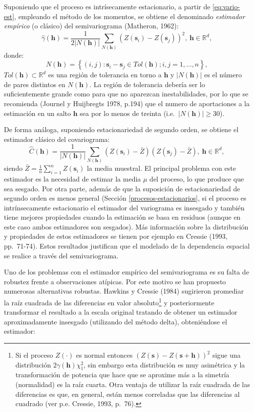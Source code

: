 \documentclass[
  spanish,
]{book}
\theoremstyle{break}
\begin{document}
Suponiendo que el proceso es intrísecamente estacionario, a partir de \eqref{eq:vario-est}, empleando el método de los momentos, se obtiene el denominado \emph{estimador empírico} (o clásico) del semivariograma (Matheron, 1962):
\[\hat{\gamma}(\mathbf{h}) = \dfrac{1}{2\left| N(\mathbf{h})\right| }
\sum\limits_{N(\mathbf{h})}\left( Z(\mathbf{s}_{i})-Z(\mathbf{s}_{j} )\right) ^2 ,\ \mathbf{h}\in \mathbb{R}^{d},\]
donde:
\[N(\mathbf{h}) = \left\{ (i,j):\mathbf{s}_{i} -\mathbf{s}_{j} \in Tol(\mathbf{h});i,j=1,\ldots,n\right\},\]
\(Tol(\mathbf{h})\subset \mathbb{R}^{d}\) es una región de tolerancia en torno a \(\mathbf{h}\) y \(\left| N(\mathbf{h})\right|\) es el número de pares distintos en \(N(\mathbf{h})\).
La región de tolerancia debería ser lo suficientemente grande como para que no aparezcan inestabilidades, por lo que se recomienda (Journel y Huijbregts 1978, p.194) que el numero de aportaciones a la estimación en un salto \(\mathbf{h}\) sea por lo menos de treinta (i.e.~\(\left| N(\mathbf{h})\right| \geq 30\)).

De forma análoga, suponiendo estacionariedad de segundo orden, se obtiene el estimador clásico del covariograma:
\[\hat{C} (\mathbf{h}) = \dfrac{1}{\left| N(\mathbf{h})\right| }
\sum\limits_{N(\mathbf{h})}\left( Z(\mathbf{s}_{i})-\bar{Z} \right)
\left( Z(\mathbf{s}_{j})-\bar{Z} \right),\ \mathbf{h}\in \mathbb{R}^{d},\]
siendo \(\bar{Z} =\frac{1}{n} \sum_{i=1}^{n}Z(\mathbf{s}_{i})\) la media muestral.
El principal problema con este estimador es la necesidad de estimar la media \(\mu\) del proceso, lo que produce que sea sesgado.
Por otra parte, además de que la suposición de estacionariedad de segundo orden es menos general (Sección \ref{procesos-estacionarios}, si el proceso es intrínsecamente estacionario el estimador del variograma es insesgado y también tiene mejores propiedades cuando la estimación se basa en residuos (aunque en este caso ambos estimadores son sesgados).
Más información sobre la distribución y propiedades de estos estimadores se tienen por ejemplo en Cressie (1993, pp.~71-74).
Estos resultados justifican que el modelado de la dependencia espacial se realice a través del semivariograma.

Uno de los problemas con el estimador empírico del semivariograma es su falta de robustez frente a observaciones atípicas.
Por este motivo se han propuesto numerosas alternativas robustas.
Hawkins y Cressie (1984) sugirieron promediar la raíz cuadrada de las diferencias en valor absoluto\footnote{Si el proceso \(Z(\cdot)\) es normal entonces
  \((Z(\mathbf{s})-Z(\mathbf{s}+\mathbf{h}))^2\) sigue una distribución \(2\gamma(\mathbf{h})\chi_1^2\), sin embargo esta distribución es muy asimétrica y la transformación de potencia que hace que se aproxime más a la simetría (normalidad) es la raíz cuarta. Otra ventaja de utilizar la raíz cuadrada de las diferencias es que, en general, están menos correladas que las diferencias al cuadrado (ver p.e. Cressie, 1993, p.~76).} y posteriormente transformar el resultado a la escala original tratando de obtener un estimador aproximadamente insesgado (utilizando del método delta), obteniéndose el estimador:
\end{document}
